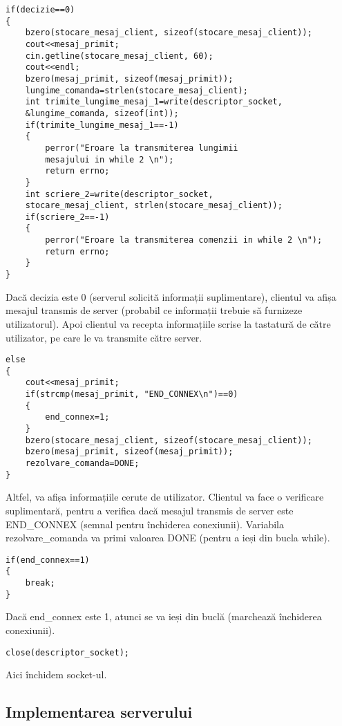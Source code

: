 \documentclass[runningheads]{llncs}
\begin{document}
\begin{verbatim}
if(decizie==0)
{
    bzero(stocare_mesaj_client, sizeof(stocare_mesaj_client));
    cout<<mesaj_primit;
    cin.getline(stocare_mesaj_client, 60);   
    cout<<endl;
    bzero(mesaj_primit, sizeof(mesaj_primit)); 
    lungime_comanda=strlen(stocare_mesaj_client);
    int trimite_lungime_mesaj_1=write(descriptor_socket, 
    &lungime_comanda, sizeof(int)); 
    if(trimite_lungime_mesaj_1==-1)
    {
        perror("Eroare la transmiterea lungimii 
        mesajului in while 2 \n");
        return errno;
    }
    int scriere_2=write(descriptor_socket,
    stocare_mesaj_client, strlen(stocare_mesaj_client));
    if(scriere_2==-1)
    {
        perror("Eroare la transmiterea comenzii in while 2 \n");
        return errno;
    }
}
\end{verbatim}
Dacă decizia este 0 (serverul solicită informații suplimentare), clientul va afișa mesajul transmis de server (probabil ce informații trebuie să furnizeze utilizatorul). Apoi clientul va recepta informațiile scrise la tastatură de către utilizator, pe care le va transmite către server.

\begin{verbatim}
else
{
    cout<<mesaj_primit;
    if(strcmp(mesaj_primit, "END_CONNEX\n")==0)
    {
        end_connex=1;
    }
    bzero(stocare_mesaj_client, sizeof(stocare_mesaj_client));
    bzero(mesaj_primit, sizeof(mesaj_primit)); 
    rezolvare_comanda=DONE;
}
\end{verbatim}
Altfel, va afișa informațiile cerute de utilizator. Clientul va face o verificare suplimentară, pentru a verifica dacă mesajul transmis de server este END\_CONNEX (semnal pentru închiderea conexiunii). Variabila rezolvare\_comanda va primi valoarea DONE (pentru a ieși din bucla while).

\begin{verbatim}
if(end_connex==1)
{
    break;
}
\end{verbatim}
Dacă end\_connex este 1, atunci se va ieși din buclă (marchează închiderea conexiunii).
\begin{verbatim}
close(descriptor_socket);
\end{verbatim}
Aici închidem socket-ul.

\subsection{Implementarea serverului}
\end{document}

